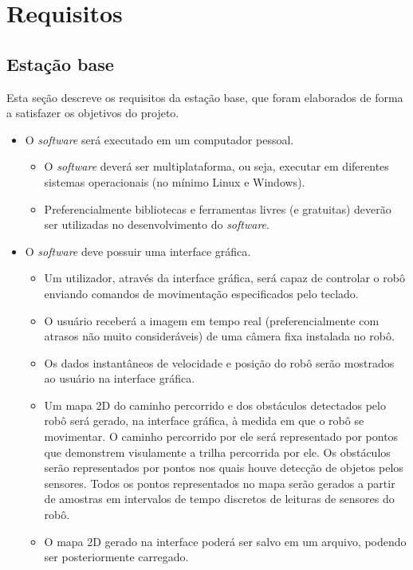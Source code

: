 \section{Requisitos}


\subsection{Estação base}
%
Esta seção descreve os requisitos da estação base, que foram elaborados de forma a satisfazer os objetivos do projeto.

\begin{itemize} %

  \item O \textit{software} será executado em um computador pessoal.
    \begin{itemize}
      \item O \textit{software} deverá ser multiplataforma, ou seja, executar em diferentes sistemas operacionais (no mínimo Linux e Windows).
      \item Preferencialmente bibliotecas e ferramentas livres (e gratuitas) deverão ser utilizadas no desenvolvimento do \textit{software}.
    \end{itemize}

  \item O \textit{software} deve possuir uma interface gráfica.
    \begin{itemize}
      \item Um utilizador, através da interface gráfica, será capaz de controlar o robô enviando comandos de movimentação especificados pelo teclado. 
      \item O usuário receberá a imagem em tempo real (preferencialmente com atrasos não muito consideráveis) de uma câmera fixa instalada no robô. 
      \item Os dados instantâneos de velocidade e posição do robô serão mostrados ao usuário na interface gráfica.
      \item Um mapa 2D do caminho percorrido e dos obstáculos detectados pelo robô será gerado, na interface gráfica, à medida em que o robô se movimentar. O caminho percorrido por ele será representado por pontos que demonstrem visulamente a trilha percorrida por ele. Os obstáculos serão representados por pontos nos quais houve detecção de objetos pelos sensores. Todos os pontos representados no mapa serão gerados a partir de amostras em intervalos de tempo discretos de leituras de sensores do robô.
      \item O mapa 2D gerado na interface poderá ser salvo em um arquivo, podendo ser posteriormente carregado.
    \end{itemize}

\end{itemize} %



